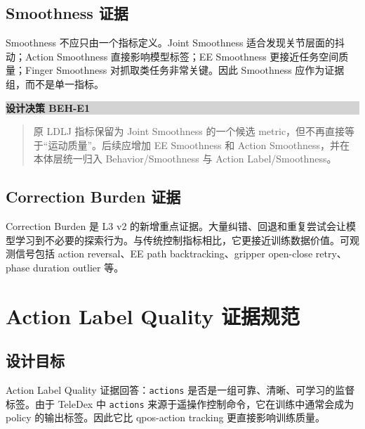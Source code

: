 \documentclass[UTF8,zihao=-4,oneside,openany]{ctexrep}
\newcommand{\Code}[1]{\texttt{#1}}
\newenvironment{decisionbox}[1]{\vspace{0.5em}\noindent\colorbox{LightGray}{\parbox{0.96\linewidth}{\textbf{#1}}}\par\vspace{-0.2em}\begin{quote}\small}{\end{quote}\vspace{0.3em}}
\begin{document}
\subsection{Smoothness 证据}

Smoothness 不应只由一个指标定义。Joint Smoothness 适合发现关节层面的抖动；Action Smoothness 直接影响模型标签；EE Smoothness 更接近任务空间质量；Finger Smoothness 对抓取类任务非常关键。因此 Smoothness 应作为证据组，而不是单一指标。

\begin{decisionbox}{设计决策 BEH-E1}
原 LDLJ 指标保留为 Joint Smoothness 的一个候选 metric，但不再直接等于“运动质量”。后续应增加 EE Smoothness 和 Action Smoothness，并在本体层统一归入 Behavior/Smoothness 与 Action Label/Smoothness。
\end{decisionbox}

\subsection{Correction Burden 证据}

Correction Burden 是 L3 v2 的新增重点证据。大量纠错、回退和重复尝试会让模型学习到不必要的探索行为。与传统控制指标相比，它更接近训练数据价值。可观测信号包括 action reversal、EE path backtracking、gripper open-close retry、phase duration outlier 等。

\section{Action Label Quality 证据规范}

\subsection{设计目标}

Action Label Quality 证据回答：\Code{actions} 是否是一组可靠、清晰、可学习的监督标签。由于 TeleDex 中 \Code{actions} 来源于遥操作控制命令，它在训练中通常会成为 policy 的输出标签。因此它比 qpos-action tracking 更直接影响训练质量。
\end{document}
